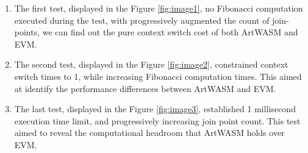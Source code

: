\begin{enumerate}
  \item The first test, displayed in the Figure \ref{fig:image1}, no Fibonacci computation executed during the test, with progressively augmented the count of join-points, we can find out the pure context switch cost of both ArtWASM and EVM.
  \item The second test, displayed in the Figure \ref{fig:image2}, constrained context switch times to 1, while increasing Fibonacci computation times. This aimed at identify the performance differences between ArtWASM and EVM.
  \item The last test, displayed in the Figure \ref{fig:image3}, established 1 millisecond execution time limit, and progressively increasing join point count. This test aimed to reveal the computational headroom that ArtWASM holds over EVM.
\end{enumerate}

